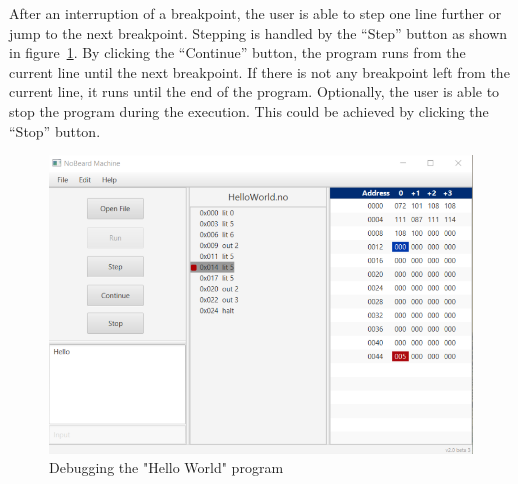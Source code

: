 After an interruption of a breakpoint, the user is able to step one line further or jump to the next breakpoint. Stepping is handled by the “Step” button as shown in figure~\ref{fig:debugging}. By clicking the “Continue” button, the program runs from the current line until the next breakpoint. If there is not any breakpoint left from the current line, it runs until the end of the program. Optionally, the user is able to stop the program during the execution. This could be achieved by clicking the “Stop” button.
\begin{figure}[h] 
	\centering
	\includegraphics[scale=.85]{images/screenshot-2.png}
	\caption{Debugging the "Hello World" program}
	\label{fig:debugging}
\end{figure}

